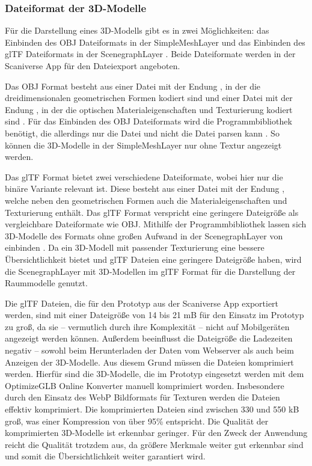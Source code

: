 \subsubsection{Dateiformat der 3D-Modelle}\label{sec:ModelFileFormat}
Für die Darstellung eines 3D-Modells gibt es in \deckgl{} zwei Möglichkeiten: das Einbinden des \ac{OBJ} Dateiformats in der SimpleMeshLayer \cite{DeckglSimpleMeshLayer} und das Einbinden des \ac{glTF} Dateiformats in der ScenegraphLayer \cite{DeckglScenegraphLayer}. Beide Dateiformate werden in der Scaniverse App für den Dateiexport angeboten.

Das \ac{OBJ} Format besteht aus einer Datei mit der Endung \obj{}, in der die dreidimensionalen geometrischen Formen kodiert sind \cite{OBJSpec} und einer Datei mit der Endung \mtl{}, in der die optischen Materialeigenschaften und Texturierung kodiert sind \cite{MTLSpec}. Für das Einbinden des \ac{OBJ} Dateiformats wird die \loadersgl{} Programmbibliothek benötigt, die allerdings nur die \obj{} Datei und nicht die \mtl{} Datei parsen kann \cite{OBJLoader}. So können die 3D-Modelle in der SimpleMeshLayer nur ohne Textur angezeigt werden.

Das \ac{glTF} Format bietet zwei verschiedene Dateiformate, wobei hier nur die binäre Variante relevant ist. Diese besteht aus einer Datei mit der Endung \glb{}, welche neben den geometrischen Formen auch die Materialeigenschaften und Texturierung enthält. Das \ac{glTF} Format verspricht eine geringere Dateigröße als vergleichbare Dateiformate wie \ac{OBJ}.\cite[Abschnitt 2]{glTFSpec} Mithilfe der \loadersgl{} Programmbibliothek lassen sich 3D-Modelle des Formats ohne großen Aufwand in der ScenegraphLayer von \deckgl{} einbinden \cite{DeckglScenegraphLayer}. Da ein 3D-Modell mit passender Texturierung eine bessere Übersichtlichkeit bietet und \ac{glTF} Dateien eine geringere Dateigröße haben, wird die ScenegraphLayer mit 3D-Modellen im \ac{glTF} Format für die Darstellung der Raummodelle genutzt.

Die \ac{glTF} Dateien, die für den Prototyp aus der Scaniverse App exportiert werden, sind mit einer Dateigröße von 14 bis 21 \ac{mB} für den Einsatz im Prototyp zu groß, da sie – vermutlich durch ihre Komplexität – nicht auf Mobilgeräten angezeigt werden können. Außerdem beeinflusst die Dateigröße die Ladezeiten negativ – sowohl beim Herunterladen der Daten vom Webserver als auch beim Anzeigen der 3D-Modelle. Aus diesem Grund müssen die Dateien komprimiert werden. Hierfür sind die 3D-Modelle, die im Prototyp eingesetzt werden mit dem OptimizeGLB Online Konverter \cite{OptimizeGLB} manuell komprimiert worden. Insbesondere durch den Einsatz des \ac{WebP} Bildformats für Texturen werden die Dateien effektiv komprimiert. Die komprimierten Dateien sind zwischen 330 und 550 \ac{kB} groß, was einer Kompression von über 95\% entspricht. Die Qualität der komprimierten 3D-Modelle ist erkennbar geringer. Für den Zweck der Anwendung reicht die Qualität trotzdem aus, da größere Merkmale weiter gut erkennbar sind und somit die Übersichtlichkeit weiter garantiert wird.

